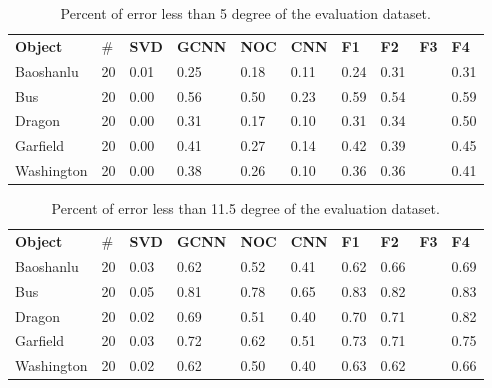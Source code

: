 \documentclass[border=15pt, multi, tikz]{article}
\newcommand{\tabhead}[1]{\textbf{#1}}
\begin{document}
\begin{table}[H]
	\centering
	\begin{tabular}{l l | l | l l l |l l l l }
		\tabhead{Object} & $ \# $ & \tabhead{SVD} & \tabhead{GCNN} & \tabhead{NOC} & \tabhead{CNN} & \tabhead{F1}& \tabhead{F2}& \tabhead{F3}& \tabhead{F4}\\
		Baoshanlu  		& 20 & 0.01 & 0.25 & 0.18 & 0.11 & 0.24 & 0.31 & & 0.31\\ 
		\hline
		Bus 			& 20 & 0.00 & 0.56 & 0.50 & 0.23 & 0.59 & 0.54 & & 0.59 \\ 
		\hline
		Dragon 			& 20 & 0.00 & 0.31 & 0.17 & 0.10 & 0.31 & 0.34 & & 0.50\\
		\hline
		Garfield 		& 20 & 0.00 & 0.41 & 0.27 & 0.14 & 0.42 & 0.39 & & 0.45\\
		\hline
		Washington 		& 20 & 0.00 & 0.38 & 0.26 & 0.10 & 0.36 & 0.36 & & 0.41\\
	\end{tabular}
	\caption{Percent of error less than 5 degree of the evaluation dataset.}	
	\label{tab:eval-5d}
\end{table}


\begin{table}[H]
	\centering
	\begin{tabular}{l l | l | l l l | l l l l }
		\tabhead{Object} & $ \# $ & \tabhead{SVD} & \tabhead{GCNN} & \tabhead{NOC} & \tabhead{CNN} & \tabhead{F1}& \tabhead{F2}& \tabhead{F3}& \tabhead{F4}\\
		Baoshanlu  		& 20 & 0.03 & 0.62 & 0.52 & 0.41 &  0.62 & 0.66 & & 0.69\\ 
		\hline
		Bus 			& 20 & 0.05 & 0.81 & 0.78 & 0.65 & 0.83 & 0.82 & & 0.83 \\ 
		\hline
		Dragon 			& 20 & 0.02 & 0.69 & 0.51 & 0.40 & 0.70 & 0.71 & & 0.82\\
		\hline
		Garfield 		& 20 & 0.03 & 0.72 & 0.62 & 0.51 &0.73 & 0.71  & & 0.75\\
		\hline
		Washington 		& 20 & 0.02 & 0.62 & 0.50 & 0.40 & 0.63 & 0.62 & & 0.66\\
	\end{tabular}
	\caption{Percent of error less than 11.5 degree of the evaluation dataset.}	
	\label{tab:eval-11d}
\end{table}
\end{document}
